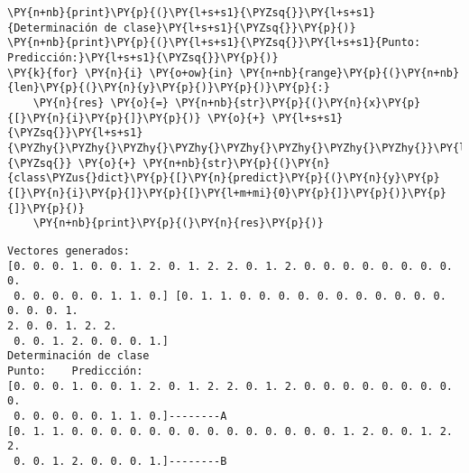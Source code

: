\begin{tcolorbox}[breakable, size=fbox, boxrule=1pt, pad at break*=1mm,colback=cellbackground, colframe=cellborder]
\begin{Verbatim}[commandchars=\\\{\}]
\PY{n+nb}{print}\PY{p}{(}\PY{l+s+s1}{\PYZsq{}}\PY{l+s+s1}{Determinación de clase}\PY{l+s+s1}{\PYZsq{}}\PY{p}{)}
\PY{n+nb}{print}\PY{p}{(}\PY{l+s+s1}{\PYZsq{}}\PY{l+s+s1}{Punto:    Predicción:}\PY{l+s+s1}{\PYZsq{}}\PY{p}{)}
\PY{k}{for} \PY{n}{i} \PY{o+ow}{in} \PY{n+nb}{range}\PY{p}{(}\PY{n+nb}{len}\PY{p}{(}\PY{n}{y}\PY{p}{)}\PY{p}{)}\PY{p}{:}
    \PY{n}{res} \PY{o}{=} \PY{n+nb}{str}\PY{p}{(}\PY{n}{x}\PY{p}{[}\PY{n}{i}\PY{p}{]}\PY{p}{)} \PY{o}{+} \PY{l+s+s1}{\PYZsq{}}\PY{l+s+s1}{\PYZhy{}\PYZhy{}\PYZhy{}\PYZhy{}\PYZhy{}\PYZhy{}\PYZhy{}\PYZhy{}}\PY{l+s+s1}{\PYZsq{}} \PY{o}{+} \PY{n+nb}{str}\PY{p}{(}\PY{n}{class\PYZus{}dict}\PY{p}{[}\PY{n}{predict}\PY{p}{(}\PY{n}{y}\PY{p}{[}\PY{n}{i}\PY{p}{]}\PY{p}{[}\PY{l+m+mi}{0}\PY{p}{]}\PY{p}{)}\PY{p}{]}\PY{p}{)}
    \PY{n+nb}{print}\PY{p}{(}\PY{n}{res}\PY{p}{)}
\end{Verbatim}
\end{tcolorbox}

    \begin{Verbatim}[commandchars=\\\{\}]
Vectores generados:
[0. 0. 0. 1. 0. 0. 1. 2. 0. 1. 2. 2. 0. 1. 2. 0. 0. 0. 0. 0. 0. 0. 0. 0.
 0. 0. 0. 0. 0. 1. 1. 0.] [0. 1. 1. 0. 0. 0. 0. 0. 0. 0. 0. 0. 0. 0. 0. 0. 0. 1.
2. 0. 0. 1. 2. 2.
 0. 0. 1. 2. 0. 0. 0. 1.]
Determinación de clase
Punto:    Predicción:
[0. 0. 0. 1. 0. 0. 1. 2. 0. 1. 2. 2. 0. 1. 2. 0. 0. 0. 0. 0. 0. 0. 0. 0.
 0. 0. 0. 0. 0. 1. 1. 0.]--------A
[0. 1. 1. 0. 0. 0. 0. 0. 0. 0. 0. 0. 0. 0. 0. 0. 0. 1. 2. 0. 0. 1. 2. 2.
 0. 0. 1. 2. 0. 0. 0. 1.]--------B
    \end{Verbatim}